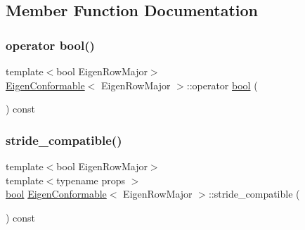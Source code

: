 \subsection{Member Function Documentation}
\mbox{\label{struct_eigen_conformable_ac7008819fa3fa453095205463c39e2fd}} 
\subsubsection{\texorpdfstring{operator bool()}{operator bool()}}
{\footnotesize\ttfamily template$<$bool Eigen\+Row\+Major$>$ \\
\mbox{\hyperlink{struct_eigen_conformable}{Eigen\+Conformable}}$<$ Eigen\+Row\+Major $>$\+::operator \mbox{\hyperlink{asdl_8h_af6a258d8f3ee5206d682d799316314b1}{bool}} (\begin{DoxyParamCaption}{ }\end{DoxyParamCaption}) const\hspace{0.3cm}{\ttfamily [inline]}}

\mbox{\label{struct_eigen_conformable_a8faa27145cf2b8940a7d8919de19f9ad}} 
\subsubsection{\texorpdfstring{stride\_compatible()}{stride\_compatible()}}
{\footnotesize\ttfamily template$<$bool Eigen\+Row\+Major$>$ \\
template$<$typename props $>$ \\
\mbox{\hyperlink{asdl_8h_af6a258d8f3ee5206d682d799316314b1}{bool}} \mbox{\hyperlink{struct_eigen_conformable}{Eigen\+Conformable}}$<$ Eigen\+Row\+Major $>$\+::stride\+\_\+compatible (\begin{DoxyParamCaption}{ }\end{DoxyParamCaption}) const\hspace{0.3cm}{\ttfamily [inline]}}




